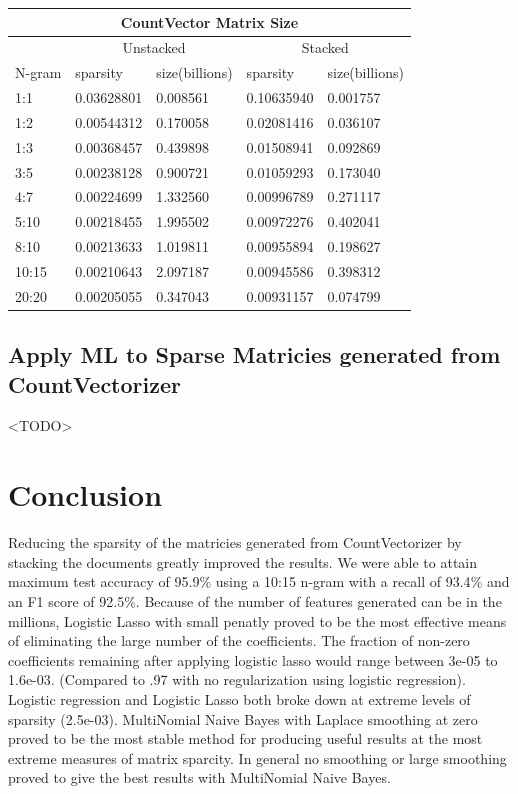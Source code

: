 \documentclass[11pt]{article}
\begin{document}
{\noindent \begin{tabular}{ |p{2cm}||p{2cm}|p{2cm}|p{2cm}|p{2cm}|  }
 \hline
 \multicolumn{5}{|c|}{CountVector Matrix Size} \\
 \hline
 \multicolumn{1}{|c|}{} &
 \multicolumn{2}{|c|}{Unstacked} &
 \multicolumn{2}{|c|}{Stacked}\\
 \hline
 N-gram & sparsity & size(billions) & sparsity & size(billions)\\
 \hline
       1:1& 0.03628801& 0.008561&  0.10635940&   0.001757 \\
       1:2& 0.00544312& 0.170058&  0.02081416&    0.036107\\
       1:3& 0.00368457& 0.439898&  0.01508941&     0.092869\\
       3:5& 0.00238128& 0.900721&  0.01059293&     0.173040\\
       4:7& 0.00224699& 1.332560&  0.00996789&     0.271117\\
      5:10& 0.00218455& 1.995502&  0.00972276&     0.402041\\
      8:10& 0.00213633& 1.019811&  0.00955894&     0.198627\\
     10:15& 0.00210643& 2.097187&  0.00945586&     0.398312\\
     20:20& 0.00205055& 0.347043&  0.00931157&     0.074799\\
 \hline
\end{tabular}

\subsection{Apply ML to Sparse Matricies generated from CountVectorizer}
<TODO>

\section{Conclusion}
Reducing the sparsity of the matricies generated from CountVectorizer by stacking the documents greatly improved the results.
We were able to attain maximum test accuracy of 95.9$\%$ using a 10:15 n-gram with a recall of 93.4$\%$ and an F1 score of 92.5$\%$.
Because of the number of features generated can be in the millions, Logistic Lasso with small penatly proved to be the most effective 
means of eliminating the large number of the coefficients. 
The fraction of non-zero coefficients remaining after applying logistic lasso
would range between 3e-05 to 1.6e-03.  (Compared to .97 with no regularization using logistic regression).
Logistic regression and Logistic Lasso both broke down at extreme levels of sparsity 
(2.5e-03). 
MultiNomial Naive Bayes with Laplace smoothing at zero proved to be the most stable method for producing useful results at the
most extreme measures of matrix sparcity.  In general no smoothing or large smoothing proved to give the best results with
MultiNomial Naive Bayes.

}
\end{document}
